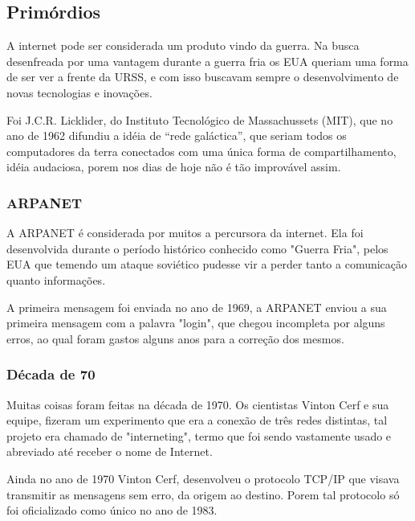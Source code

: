 \documentclass[
	12pt,				%
	openright,			%
	twoside,			%
	a4paper,			%
	Times,
	brazil,				%
	]{abntex2}
\begin{document}
\subsection{Primórdios}

A internet pode ser considerada um produto vindo da guerra. Na busca desenfreada por uma vantagem durante a guerra fria os EUA queriam uma forma de ser ver a frente da URSS, e com isso buscavam sempre o desenvolvimento de novas tecnologias e inovações. \cite{historia-internt}
\par

Foi J.C.R. Licklider, do Instituto Tecnológico de Massachussets (MIT), que no ano de 1962 difundiu a idéia de  “rede galáctica”, que seriam todos os computadores da terra conectados com uma única forma de compartilhamento, idéia audaciosa, porem nos dias de hoje não é tão improvável assim. \cite{historia-internt}
\par

\subsubsection{ARPANET}

A ARPANET é considerada por muitos a percursora da internet. Ela foi desenvolvida durante o período histórico conhecido como "Guerra Fria", pelos EUA que temendo um ataque soviético pudesse vir a perder tanto a comunicação quanto informações. \cite{ARPANET}
\par

A primeira mensagem foi enviada no ano de 1969, a ARPANET enviou a sua primeira mensagem com a palavra "login", que chegou incompleta por alguns erros, ao qual foram gastos alguns anos para a correção dos mesmos. \cite{historia-internt}
\par

\subsubsection{Década de 70}

Muitas coisas foram feitas na década de 1970. Os cientistas Vinton Cerf e sua equipe, fizeram um experimento que era a conexão de três redes distintas, tal projeto era chamado de "interneting", termo que foi sendo vastamente usado e abreviado até receber o nome de Internet. \cite{historia-internt}
\par

Ainda no ano de 1970 Vinton Cerf, desenvolveu o protocolo TCP/IP que visava transmitir as mensagens sem erro, da origem ao destino. Porem tal protocolo só foi oficializado como único no ano de  1983.\cite{historia-internt}
\par
\end{document}
